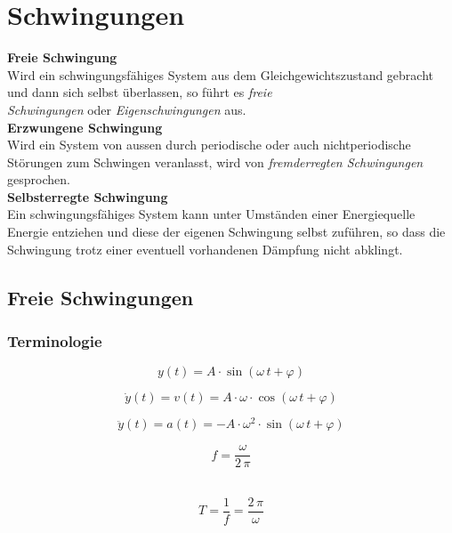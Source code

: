 \section{Schwingungen}

\textbf{Freie Schwingung} \\
Wird ein schwingungsfähiges System aus dem Gleichgewichtszustand gebracht und dann sich
selbst überlassen, so führt es \textit{freie \\
Schwingungen} oder \textit{Eigenschwingungen} aus. \\


\textbf{Erzwungene Schwingung} \\
Wird ein System von aussen durch periodische oder auch nichtperiodische Störungen zum
Schwingen veranlasst, wird von \textit{fremderregten Schwingungen} gesprochen. \\



\textbf{Selbsterregte Schwingung} \\
Ein schwingungsfähiges System kann unter Umständen einer Energiequelle Energie entziehen
und diese der eigenen Schwingung selbst zuführen, so dass die Schwingung trotz einer
eventuell vorhandenen Dämpfung nicht abklingt. 






\subsection{Freie Schwingungen}

\subsubsection{Terminologie}

$$ \boxed{  y(t) = A \cdot \sin(\omega \, t + \varphi) } $$
\begin{minipage}{0.48\linewidth}
$$ \dot{y}(t) =  v(t) = A \cdot \omega \cdot \cos(\omega \, t + \varphi) $$
\end{minipage} 
\hfill
\begin{minipage}{0.48\linewidth}
$$ \ddot{y}(t) = a(t) = - A \cdot \omega^2 \cdot \sin(\omega \, t + \varphi) $$
\end{minipage}

\begin{minipage}{0.48\linewidth}
$$ \boxed{ f = \frac{\omega}{2 \, \pi}  } $$\\
\end{minipage}
\hfill
\begin{minipage}{0.48\linewidth}
$$ \boxed{ T = \frac{1}{f} = \frac{2 \, \pi}{\omega}  } $$ \\
\end{minipage}



